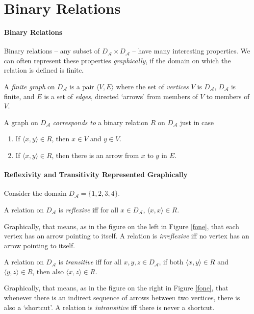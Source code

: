 \section{Binary Relations}




\paragraph{Binary Relations}

Binary relations – any subset of $D_{\mathscr{A}}\times D_{\mathscr{A}}$ – have many interesting properties. We can often represent these properties \emph{graphically}, if the domain on which the relation is defined is finite.

\begin{definition}
	A \emph{finite graph} on $D_{\mathscr{A}}$ is a pair $\langle V, E\rangle$ where the set of \emph{vertices} $V$ is $D_{\mathscr{A}}$, $D_{\mathscr{A}}$ is finite, and $E$ is a set of \emph{edges}, directed `arrows' from members of $V$ to members of $V$.
\end{definition} A graph on $D_{\mathscr{A}}$ \emph{corresponds to} a binary relation $R$ on $D_{\mathscr{A}}$ just in case \begin{enumerate}
	\item If $\langle x,y\rangle \in R$, then $x\in V$ and $y \in V$.
	\item If $\langle x,y\rangle \in R$, then there is an arrow from $x$ to $y$ in $E$.
\end{enumerate}

\paragraph{Reflexivity and Transitivity Represented Graphically}

Consider the domain $D_{\mathscr{A}}=\{1,2,3,4\}$.

\begin{definition}[Reflexive]
	A relation on $D_{\mathscr{A}}$ is \emph{reflexive} iff for all $x\in D_{\mathscr{A}}$, $\langle x,x\rangle\in R$. 
\end{definition}Graphically, that means, as in the figure on the left in Figure \ref{fone}, that each vertex has an arrow pointing to itself. A relation is \emph{irreflexive} iff no vertex has an arrow pointing to itself.

\begin{definition}[Transitive]
	A relation on $D_{\mathscr{A}}$ is \emph{transitive} iff for all $x,y,z\in D_{\mathscr{A}}$, if both $\langle x,y\rangle\in R$ and $\langle y,z\rangle\in R$, then also $\langle x,z\rangle\in R$.
\end{definition} Graphically, that means, as in the figure on the right in Figure \ref{fone}, that whenever there is an indirect sequence of arrows between two vertices, there is also a `shortcut'. A relation is \emph{intransitive} iff there is never a shortcut.

